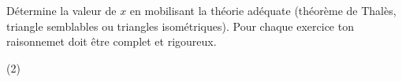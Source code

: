 %
%
    Détermine la valeur de $x$ en mobilisant la théorie adéquate (théorème de Thalès, triangle semblables ou triangles isométriques). Pour chaque exercice ton raisonnemet doit être complet et rigoureux.
    \begin{tasks}(2)
        \task 
        \task 
        \task  
        \task 
    \end{tasks}
